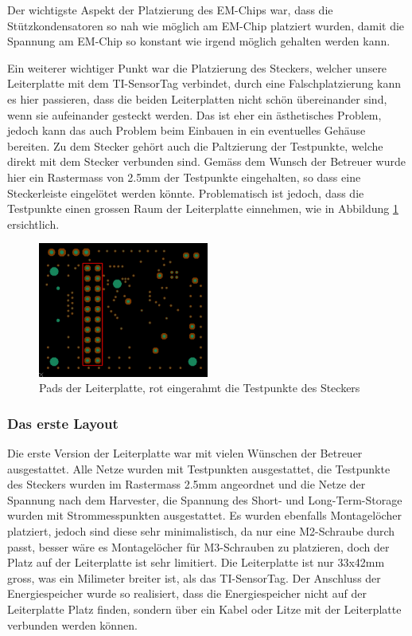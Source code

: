 Der wichtigste Aspekt der Platzierung des EM-Chips war, dass die Stützkondensatoren so nah wie möglich am EM-Chip platziert wurden, damit die Spannung am EM-Chip so konstant wie irgend möglich gehalten werden kann.

Ein weiterer wichtiger Punkt war die Platzierung des Steckers, welcher unsere Leiterplatte mit dem TI-SensorTag verbindet, durch eine Falschplatzierung kann es hier passieren, dass die beiden Leiterplatten nicht schön übereinander sind, wenn sie aufeinander gesteckt werden. Das ist eher ein ästhetisches Problem, jedoch kann das auch Problem beim Einbauen in ein eventuelles Gehäuse bereiten. Zu dem Stecker gehört auch die Paltzierung der Testpunkte, welche direkt mit dem Stecker verbunden sind. Gemäss dem Wunsch der Betreuer wurde hier ein Rastermass von 2.5mm der Testpunkte eingehalten, so dass eine Steckerleiste eingelötet werden könnte. Problematisch ist jedoch, dass die Testpunkte einen grossen Raum der Leiterplatte einnehmen, wie in Abbildung \ref{layout_testpunkteraster} ersichtlich.

\begin{figure}[ht]
    \includegraphics[width=0.5\textwidth]{3Vorgehen/imag/Layout_Testpunkteraster.png}
    \caption{Pads der Leiterplatte, rot eingerahmt die Testpunkte des Steckers}\label{layout_testpunkteraster} 
\end{figure}

\subsubsection{Das erste Layout}

Die erste Version der Leiterplatte war mit vielen Wünschen der Betreuer ausgestattet. Alle Netze wurden mit Testpunkten ausgestattet, die Testpunkte des Steckers wurden im Rastermass 2.5mm angeordnet und die Netze der Spannung nach dem Harvester, die Spannung des Short- und Long-Term-Storage wurden mit Strommesspunkten ausgestattet. Es wurden ebenfalls Montagelöcher platziert, jedoch sind diese sehr minimalistisch, da nur eine M2-Schraube durch passt, besser wäre es Montagelöcher für M3-Schrauben zu platzieren, doch der Platz auf der Leiterplatte ist sehr limitiert. Die Leiterplatte ist nur 33x42mm gross, was ein Milimeter breiter ist, als das TI-SensorTag. Der Anschluss der Energiespeicher wurde so realisiert, dass die Energiespeicher nicht auf der Leiterplatte Platz finden, sondern über ein Kabel oder Litze mit der Leiterplatte verbunden werden können.

